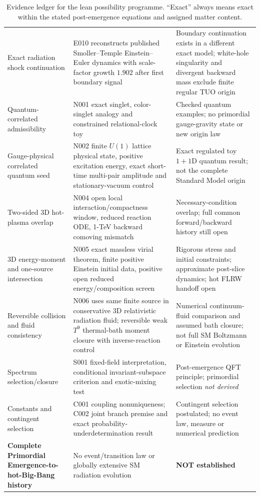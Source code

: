 \documentclass[11pt,a4paper]{article}
\theoremstyle{tmon}
\theoremstyle{definition}
\begin{document}
\begin{table}[htbp]
\begin{tabularx}{\linewidth}{@{}p{.21\linewidth}Yp{.23\linewidth}@{}}
Exact radiation shock continuation & E010 reconstructs published Smoller--Temple Einstein--Euler dynamics with scale-factor growth $1.902$ after first boundary signal & Boundary continuation exists in a different exact model; white-hole singularity and divergent backward mass exclude finite regular TUO origin\\
Quantum-correlated admissibility & N001 exact singlet, color-singlet analogy and constrained relational-clock toy & Checked quantum examples; no primordial gauge-gravity state or new origin law\\
Gauge-physical correlated quantum seed & N002 finite $U(1)$ lattice physical state, positive excitation energy, exact short-time multi-pair amplitude and stationary-vacuum control & Exact regulated toy $1+1$D quantum result; not the complete Standard Model origin\\
Two-sided 3D hot-plasma overlap & N004 open local interaction/compactness window, reduced reaction ODE, 1-TeV backward comoving mismatch & Necessary-condition overlap; full common forward/backward history still open\\
3D energy-moment and one-source intersection & N005 exact massless virial theorem, finite positive Einstein initial data, positive open reduced energy/composition screen & Rigorous stress and initial constraints; approximate post-slice dynamics; hot FLRW handoff open\\
Reversible collision and fluid consistency & N006 uses same finite source in conservative 3D relativistic radiation fluid; reversible weak $T^9$ thermal-bath moment closure with inverse-reaction control & Numerical continuum-fluid comparison and assumed bath closure; not full SM Boltzmann or Einstein evolution\\
Spectrum selection/closure & S001 fixed-field interpretation, conditional invariant-subspace criterion and exotic-mixing test & Post-emergence QFT principle; primordial selection \emph{not derived}\\
Constants and contingent selection & C001 coupling nonuniqueness; C002 joint branch premise and exact probability-underdetermination result & Contingent selection postulated; no event law, measure or numerical prediction\\
\textbf{Complete Primordial Emergence-to-hot-Big-Bang history} & No event/transition law or globally extensive SM radiation evolution & \textbf{NOT established}\\\bottomrule
\end{tabularx}
\caption{Evidence ledger for the lean possibility programme. ``Exact'' always means exact within the stated post-emergence equations and assigned matter content.}\label{tab:officialledger}
\end{table}
\end{document}
